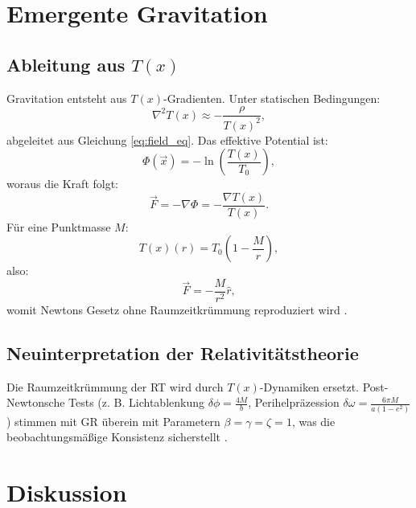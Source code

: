 \documentclass[12pt,a4paper]{article}
\newcommand{\Tfield}{T(x)}
\newcommand{\Tzero}{T_0}
\newcommand{\vecx}{\vec{x}}
\begin{document}
	\section{Emergente Gravitation}
	\label{sec:emergent_grav}
	
	\subsection{Ableitung aus \(\Tfield\)}
	\label{subsec:grav_derivation}
	
	Gravitation entsteht aus \(\Tfield\)-Gradienten. Unter statischen Bedingungen:
	\begin{equation}
		\nabla^2\Tfield \approx -\frac{\rho}{\Tfield^2},
		\label{eq:static_field}
	\end{equation}
	abgeleitet aus Gleichung \ref{eq:field_eq}. Das effektive Potential ist:
	\begin{equation}
		\Phi(\vecx) = -\ln\left(\frac{\Tfield}{\Tzero}\right),
		\label{eq:grav_potential_def}
	\end{equation}
	woraus die Kraft folgt:
	\begin{equation}
		\vec{F} = -\nabla\Phi = -\frac{\nabla\Tfield}{\Tfield}.
		\label{eq:force_from_potential}
	\end{equation}
	Für eine Punktmasse \(M\):
	\begin{equation}
		\Tfield(r) = \Tzero\left(1 - \frac{M}{r}\right),
		\label{eq:time_field_point_mass}
	\end{equation}
	also:
	\begin{equation}
		\vec{F} = -\frac{M}{r^2} \hat{r},
		\label{eq:newton_law}
	\end{equation}
	womit Newtons Gesetz ohne Raumzeitkrümmung reproduziert wird \cite{pascher_emergente_2025}.
	
	\subsection{Neuinterpretation der Relativitätstheorie}
	\label{subsec:rt_reinterpretation}
	
	Die Raumzeitkrümmung der RT wird durch \(\Tfield\)-Dynamiken ersetzt. Post-Newtonsche Tests (z. B. Lichtablenkung \(\delta\phi = \frac{4M}{b}\), Perihelpräzession \(\delta\omega = \frac{6\pi M}{a(1-e^2)}\)) stimmen mit GR überein mit Parametern \(\beta = \gamma = \zeta = 1\), was die beobachtungsmäßige Konsistenz sicherstellt \cite{Will2014}.
	
	\section{Diskussion}
	\label{sec:discussion}
	
\end{document}
